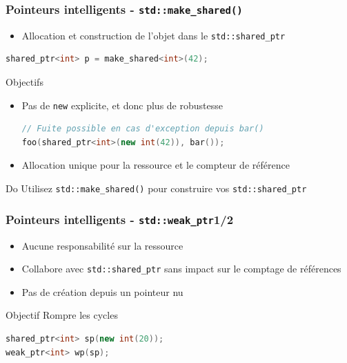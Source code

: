 \documentclass[C++.tex]{subfiles}
\begin{document}
\begin{frame}[fragile]
	\frametitle{Pointeurs intelligents - \lstinline|std::make_shared()|}
	\begin{itemize}
		\item Allocation et construction de l'objet dans le \lstinline|std::shared_ptr|
	\end{itemize}

	\begin{lstlisting}[language=C++]
shared_ptr<int> p = make_shared<int>(42);\end{lstlisting}

	\begin{block}{Objectifs}
		\begin{itemize}
			\item Pas de \lstinline|new| explicite, et donc plus de robustesse


			\begin{lstlisting}[language=C++]
// Fuite possible en cas d'exception depuis bar()
foo(shared_ptr<int>(new int(42)), bar());\end{lstlisting}

			\item Allocation unique pour la ressource et le compteur de référence
		\end{itemize}
	\end{block}

	\begin{exampleblock}{Do}
		Utilisez \lstinline|std::make_shared()| pour construire vos \lstinline|std::shared_ptr|
	\end{exampleblock}
\end{frame}

\begin{frame}[fragile]
	\frametitle{Pointeurs intelligents - \lstinline|std::weak_ptr|\titlehfill{}1/2}
	\begin{itemize}
		\item Aucune responsabilité sur la ressource
		\item Collabore avec \lstinline|std::shared_ptr| sans impact sur le comptage de références
		\item Pas de création depuis un pointeur nu
	\end{itemize}

	\begin{block}{Objectif}
		Rompre les cycles 
	\end{block}

	\begin{lstlisting}[language=C++]
shared_ptr<int> sp(new int(20));
weak_ptr<int> wp(sp);\end{lstlisting}
\end{frame}
\end{document}

